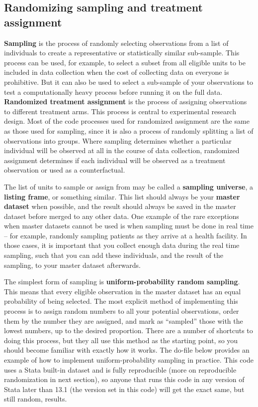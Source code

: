 \subsection{Randomizing sampling and treatment assignment}

\textbf{Sampling} is the process of randomly selecting observations
from a list of individuals to create a representative or statistically similar sub-sample.
This process can be used, for example, to select a subset from all eligible units
to be included in data collection when the cost of collecting data on everyone is prohibitive.
But it can also be used to select a sub-sample of your observations to test a computationally heavy process
before running it on the full data.
\textbf{Randomized treatment assignment} is the process of assigning observations to different treatment arms.
This process is central to experimental research design.
Most of the code processes used for randomized assignment are the same as those used for sampling,
since it is also a process of randomly splitting a list of observations into groups.
Where sampling determines whether a particular individual
will be observed at all in the course of data collection,
randomized assignment determines if each individual will be observed
as a treatment observation or used as a counterfactual.

The list of units to sample or assign from may be called a \textbf{sampling universe},
a \textbf{listing frame}, or something similar.
This list should always be your \textbf{master dataset} when possible,
and the result should always be saved in the master dataset
before merged to any other data.
One example of the rare exceptions
when master datasets cannot be used is
when sampling must be done in real time --
for example, randomly sampling patients
as they arrive at a health facility.
In those cases,
it is important that you collect enough data
during the real time sampling,
such that you can add these individuals,
and the result of the sampling,
to your master dataset afterwards.

The simplest form of sampling is
\textbf{uniform-probability random sampling}.
This means that every eligible observation in the master dataset
has an equal probability of being selected.
The most explicit method of implementing this process
is to assign random numbers to all your potential observations,
order them by the number they are assigned,
and mark as ``sampled'' those with the lowest numbers, up to the desired proportion.
There are a number of shortcuts to doing this process,
but they all use this method as the starting point,
so you should become familiar with exactly how it works.
The do-file below provides an example of
how to implement uniform-probability sampling in practice.
This code uses a Stata built-in dataset and is fully reproducible
(more on reproducible randomization in next section),
so anyone that runs this code in any version of Stata later than 13.1
(the version set in this code)
will get the exact same, but still random, results.

